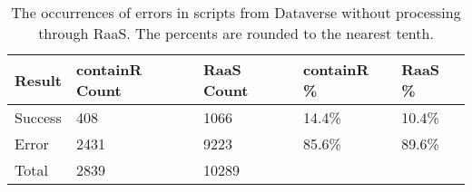 \begin{table}
\centering
\caption{The occurrences of errors in scripts from Dataverse without processing through RaaS. The percents are rounded to the nearest tenth.}
\label{tab:error-occurrences}
\begin{tabular}{lllll}
\toprule
 Result & containR Count & RaaS Count & containR \% & RaaS \% \\
\midrule
Success &            408 &       1066 &      14.4\% &  10.4\% \\ \hline
  Error &           2431 &       9223 &      85.6\% &  89.6\% \\ \hline
  Total &           2839 &      10289 &            &        \\
\bottomrule
\end{tabular}
\end{table}
